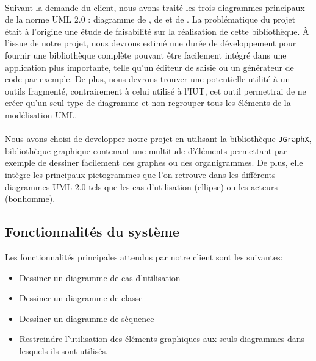 \documentclass[12pt,a4paper,openany]{report}
\begin{document}
	\paragraph{}
	Suivant la demande du client, nous avons traité les trois diagrammes principaux de la norme UML 2.0 :
	diagramme de , de 
	 et de .
	La problématique du projet était à l'origine une étude de faisabilité sur la réalisation de cette bibliothèque.
	À l'issue de notre projet, nous devrons estimé une durée de développement pour fournir une bibliothèque complète
	pouvant être facilement intégré dans une application plus importante, telle qu'un éditeur de saisie ou un générateur de code par exemple.
	De plus, nous devrons trouver une potentielle utilité à un outils fragmenté, contrairement à celui utilisé à l'IUT,
	cet outil permettrai de ne créer qu'un seul type de diagramme et non regrouper tous les éléments de la modélisation UML.

	\paragraph{}
	Nous avons choisi de developper notre projet en utilisant la bibliothèque \texttt{JGraphX},
	bibliothèque graphique contenant une multitude d'éléments permettant
	par exemple de dessiner facilement des graphes ou des organigrammes. De plus, elle intègre les principaux 
	pictogrammes que l'on retrouve dans les différents diagrammes UML 2.0 tels que les cas d'utilisation (ellipse)
	ou les acteurs (bonhomme).
\newpage
	\subsection{Fonctionnalités du système}
	Les fonctionnalités principales attendus par notre client sont les suivantes:
	\begin{itemize}
		\item Dessiner un diagramme de cas d'utilisation
		\item Dessiner un diagramme de classe 
		\item Dessiner un diagramme de séquence 
		\item Restreindre l'utilisation des éléments graphiques aux seuls diagrammes dans lesquels ils sont utilisés.  \end{itemize}
\end{document}
